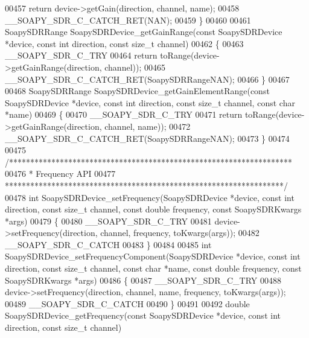 \begin{DoxyCode}
00457     \textcolor{keywordflow}{return} device->getGain(direction, channel, name);
00458     __SOAPY_SDR_C_CATCH_RET(NAN);
00459 \}
00460 
00461 SoapySDRRange SoapySDRDevice_getGainRange(\textcolor{keyword}{const} SoapySDRDevice *device, \textcolor{keyword}{const} \textcolor{keywordtype}{int} direction, \textcolor{keyword}{const} \textcolor{keywordtype}{size\_t} 
      channel)
00462 \{
00463     __SOAPY_SDR_C_TRY
00464     \textcolor{keywordflow}{return} toRange(device->getGainRange(direction, channel));
00465     __SOAPY_SDR_C_CATCH_RET(SoapySDRRangeNAN);
00466 \}
00467 
00468 SoapySDRRange SoapySDRDevice_getGainElementRange(\textcolor{keyword}{const} SoapySDRDevice *device, \textcolor{keyword}{const} \textcolor{keywordtype}{int} direction, \textcolor{keyword}{const} \textcolor{keywordtype}{
      size\_t} channel, \textcolor{keyword}{const} \textcolor{keywordtype}{char} *name)
00469 \{
00470     __SOAPY_SDR_C_TRY
00471     \textcolor{keywordflow}{return} toRange(device->getGainRange(direction, channel, name));
00472     __SOAPY_SDR_C_CATCH_RET(SoapySDRRangeNAN);
00473 \}
00474 
00475 \textcolor{comment}{/*******************************************************************}
00476 \textcolor{comment}{ * Frequency API}
00477 \textcolor{comment}{ ******************************************************************/}
00478 \textcolor{keywordtype}{int} SoapySDRDevice_setFrequency(SoapySDRDevice *device, \textcolor{keyword}{const} \textcolor{keywordtype}{int} direction, \textcolor{keyword}{const} \textcolor{keywordtype}{size\_t} channel, \textcolor{keyword}{const} \textcolor{keywordtype}{
      double} frequency, \textcolor{keyword}{const} SoapySDRKwargs *args)
00479 \{
00480     __SOAPY_SDR_C_TRY
00481     device->setFrequency(direction, channel, frequency, toKwargs(args));
00482     __SOAPY_SDR_C_CATCH
00483 \}
00484 
00485 \textcolor{keywordtype}{int} SoapySDRDevice_setFrequencyComponent(SoapySDRDevice *device, \textcolor{keyword}{const} \textcolor{keywordtype}{int} direction, \textcolor{keyword}{const} \textcolor{keywordtype}{size\_t} channel,
       \textcolor{keyword}{const} \textcolor{keywordtype}{char} *name, \textcolor{keyword}{const} \textcolor{keywordtype}{double} frequency, \textcolor{keyword}{const} SoapySDRKwargs *args)
00486 \{
00487     __SOAPY_SDR_C_TRY
00488     device->setFrequency(direction, channel, name, frequency, toKwargs(args));
00489     __SOAPY_SDR_C_CATCH
00490 \}
00491 
00492 \textcolor{keywordtype}{double} SoapySDRDevice_getFrequency(\textcolor{keyword}{const} SoapySDRDevice *device, \textcolor{keyword}{const} \textcolor{keywordtype}{int} direction, \textcolor{keyword}{const} \textcolor{keywordtype}{size\_t} channel)

\end{DoxyCode}
